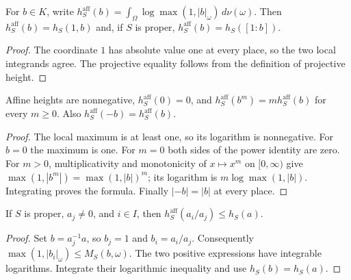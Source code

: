 \begin{definition}\label{def:affine-height}
\leanok
For $b\in K$, write
$h_S^{\mathrm{aff}}(b)=\int_\Omega\log\max(1,|b|_\omega)\,d\nu(\omega)$.
Then $h_S^{\mathrm{aff}}(b)=h_S(1,b)$ and, if $S$ is proper,
$h_S^{\mathrm{aff}}(b)=h_S([1:b])$.
\end{definition}
\begin{proof}
The coordinate $1$ has absolute value one at every place, so the
two local integrands agree. The projective equality follows from the
definition of projective height.
\end{proof}

\begin{lemma}\label{lem:affine-height-power}
\leanok
Affine heights are nonnegative, $h_S^{\mathrm{aff}}(0)=0$, and
$h_S^{\mathrm{aff}}(b^m)=m h_S^{\mathrm{aff}}(b)$ for every $m\geq0$.
Also $h_S^{\mathrm{aff}}(-b)=h_S^{\mathrm{aff}}(b)$.
\end{lemma}
\begin{proof}
The local maximum is at least one, so its logarithm is nonnegative.
For $b=0$ the maximum is one. For $m=0$ both sides of the power
identity are zero. For $m>0$, multiplicativity and monotonicity of
$x\mapsto x^m$ on $[0,\infty)$ give
$\max(1,|b^m|)=\max(1,|b|)^m$; its logarithm is
$m\log\max(1,|b|)$. Integrating proves the formula.
Finally $|-b|=|b|$ at every place.
\end{proof}

\begin{proposition}
\label{prop:height-coordinate-bound}
\leanok
If $S$ is proper, $a_j\ne0$, and $i\in I$, then
$h_S^{\mathrm{aff}}(a_i/a_j)\leq h_S(a)$.
\end{proposition}
\begin{proof}
Set $b=a_j^{-1}a$, so $b_j=1$ and $b_i=a_i/a_j$.
Consequently $\max(1,|b_i|_\omega)\leq M_S(b,\omega)$.
The two positive expressions have integrable logarithms. Integrate
their logarithmic inequality and use $h_S(b)=h_S(a)$.
\end{proof}

